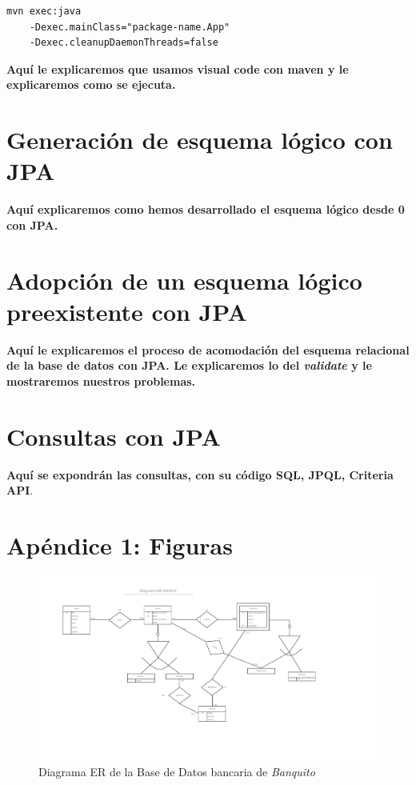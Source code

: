 \documentclass[11pt,a4paper]{article}
\begin{document}
\begin{lstlisting}
mvn exec:java 
	-Dexec.mainClass="package-name.App" 
	-Dexec.cleanupDaemonThreads=false
\end{lstlisting}

\textbf{Aquí le explicaremos que usamos visual code con maven y le explicaremos como se ejecuta.}

\section{Generación de esquema lógico con JPA}

\textbf{Aquí explicaremos como hemos desarrollado el esquema lógico desde 0 con JPA.}

\section{Adopción de un esquema lógico preexistente con JPA}

\textbf{Aquí le explicaremos el proceso de acomodación del esquema relacional de la base de datos con JPA. Le explicaremos lo del \emph{validate} y le mostraremos nuestros problemas.}

\section{Consultas con JPA}

\textbf{Aquí se expondrán las consultas, con su código SQL, JPQL, Criteria API}.

\section{Apéndice 1: Figuras}

\begin{landscape}
\begin{figure}
\centering
\includegraphics[scale=0.75]{images/diagramaer.png}
\caption{Diagrama ER de la Base de Datos bancaria de \emph{Banquito}}
\label{fig:diagramaer}
\end{figure}
\end{landscape}
\end{document}
